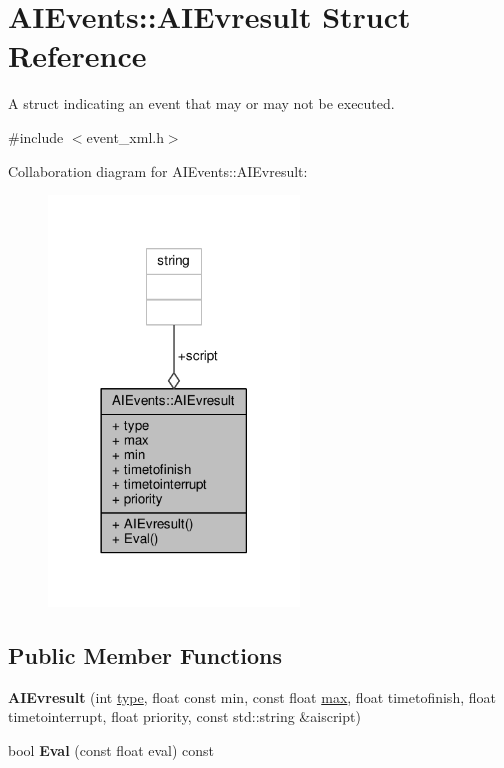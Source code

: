 \hypertarget{structAIEvents_1_1AIEvresult}{}\section{A\+I\+Events\+:\+:A\+I\+Evresult Struct Reference}
\label{structAIEvents_1_1AIEvresult}


A struct indicating an event that may or may not be executed.  




{\ttfamily \#include $<$event\+\_\+xml.\+h$>$}



Collaboration diagram for A\+I\+Events\+:\+:A\+I\+Evresult\+:
\nopagebreak
\begin{figure}[H]
\begin{center}
\leavevmode
\includegraphics[width=189pt]{dc/db6/structAIEvents_1_1AIEvresult__coll__graph}
\end{center}
\end{figure}
\subsection*{Public Member Functions}
\begin{DoxyCompactItemize}
\item 
{\bfseries A\+I\+Evresult} (int \hyperlink{structAIEvents_1_1AIEvresult_a9451d24c24b691e1e5da2858d89d03ad}{type}, float const min, const float \hyperlink{structAIEvents_1_1AIEvresult_a73c1e1005a163ac566b75b9afd027bc3}{max}, float timetofinish, float timetointerrupt, float priority, const std\+::string \&aiscript)\hypertarget{structAIEvents_1_1AIEvresult_a7a6ff4a3c2bb5967701210fa5608f21c}{}\label{structAIEvents_1_1AIEvresult_a7a6ff4a3c2bb5967701210fa5608f21c}

\item 
bool {\bfseries Eval} (const float eval) const \hypertarget{structAIEvents_1_1AIEvresult_aa3b100ebf940a643660ac0e4e3b7fc2a}{}\label{structAIEvents_1_1AIEvresult_aa3b100ebf940a643660ac0e4e3b7fc2a}

\end{DoxyCompactItemize}
